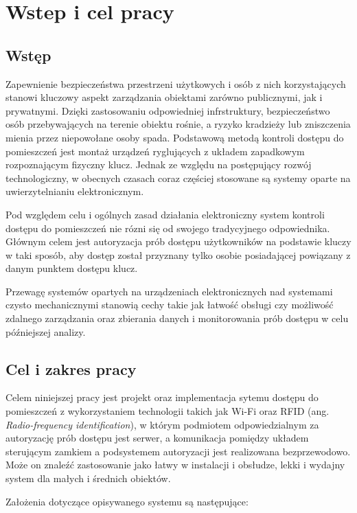 \chapter{Wstep i cel pracy}
\label{chap:intro}

	\section{Wstęp}

		Zapewnienie bezpieczeństwa przestrzeni użytkowych i osób z nich korzystających stanowi kluczowy aspekt zarządzania obiektami zarówno publicznymi, jak i prywatnymi. Dzięki zastosowaniu odpowiedniej infrstruktury, bezpieczeństwo osób przebywających na terenie obiektu rośnie, a ryzyko kradzieży lub zniszczenia mienia przez niepowołane osoby spada. Podstawową metodą kontroli dostępu do pomieszczeń jest montaż urządzeń ryglujących z układem zapadkowym rozpoznającym fizyczny klucz. Jednak ze względu na postępujący rozwój technologiczny, w obecnych czasach coraz częściej stosowane są systemy oparte na uwierzytelnianiu elektronicznym.

		Pod względem celu i ogólnych zasad działania elektroniczny system kontroli dostępu do pomieszczeń nie rózni się od swojego tradycyjnego odpowiednika. Głównym celem jest autoryzacja prób dostępu użytkowników na podstawie kluczy w taki sposób, aby dostęp został przyznany tylko osobie posiadającej powiązany z danym punktem dostępu klucz.

		Przewagę systemów opartych na urządzeniach elektronicznych nad systemami czysto mechanicznymi stanowią cechy takie jak łatwość obsługi czy możliwość zdalnego zarządzania oraz zbierania danych i monitorowania prób dostępu w celu późniejszej analizy.

	\section{Cel i zakres pracy}

		Celem niniejszej pracy jest projekt oraz implementacja sytemu dostępu do pomieszczeń z wykorzystaniem technologii takich jak Wi-Fi oraz RFID (ang. \textit{Radio-frequency identification}), w którym podmiotem odpowiedzialnym za autoryzację prób dostępu jest serwer, a komunikacja pomiędzy układem sterującym zamkiem a podsystemem autoryzacji jest realizowana bezprzewodowo. Może on znaleźć zastosowanie jako łatwy w instalacji i obsłudze, lekki i wydajny system dla małych i średnich obiektów.

		Założenia dotyczące opisywanego systemu są następujące:

